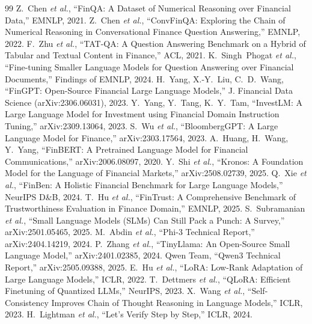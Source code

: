 \documentclass[conference]{IEEEtran}
\begin{document}
\small
\begin{thebibliography}{99}
 Z.~Chen \emph{et al.}, ``FinQA: A Dataset of Numerical Reasoning over Financial Data,'' EMNLP, 2021.
 Z.~Chen \emph{et al.}, ``ConvFinQA: Exploring the Chain of Numerical Reasoning in Conversational Finance Question Answering,'' EMNLP, 2022.
 F.~Zhu \emph{et al.}, ``TAT-QA: A Question Answering Benchmark on a Hybrid of Tabular and Textual Content in Finance,'' ACL, 2021.
 K.~Singh~Phogat \emph{et al.}, ``Fine-tuning Smaller Language Models for Question Answering over Financial Documents,'' Findings of EMNLP, 2024.
 H.~Yang, X.-Y.~Liu, C.~D.~Wang, ``FinGPT: Open-Source Financial Large Language Models,'' J. Financial Data Science (arXiv:2306.06031), 2023.
 Y.~Yang, Y.~Tang, K.~Y.~Tam, ``InvestLM: A Large Language Model for Investment using Financial Domain Instruction Tuning,'' arXiv:2309.13064, 2023.
 S.~Wu \emph{et al.}, ``BloombergGPT: A Large Language Model for Finance,'' arXiv:2303.17564, 2023.
 A.~Huang, H.~Wang, Y.~Yang, ``FinBERT: A Pretrained Language Model for Financial Communications,'' arXiv:2006.08097, 2020.
 Y.~Shi \emph{et al.}, ``Kronos: A Foundation Model for the Language of Financial Markets,'' arXiv:2508.02739, 2025.
 Q.~Xie \emph{et al.}, ``FinBen: A Holistic Financial Benchmark for Large Language Models,'' NeurIPS D\&B, 2024.
 T.~Hu \emph{et al.}, ``FinTrust: A Comprehensive Benchmark of Trustworthiness Evaluation in Finance Domain,'' EMNLP, 2025.
 S.~Subramanian \emph{et al.}, ``Small Language Models (SLMs) Can Still Pack a Punch: A Survey,'' arXiv:2501.05465, 2025.
 M.~Abdin \emph{et al.}, ``Phi-3 Technical Report,'' arXiv:2404.14219, 2024.
 P.~Zhang \emph{et al.}, ``TinyLlama: An Open-Source Small Language Model,'' arXiv:2401.02385, 2024.
 Qwen Team, ``Qwen3 Technical Report,'' arXiv:2505.09388, 2025.
 E.~Hu \emph{et al.}, ``LoRA: Low-Rank Adaptation of Large Language Models,'' ICLR, 2022.
 T.~Dettmers \emph{et al.}, ``QLoRA: Efficient Finetuning of Quantized LLMs,'' NeurIPS, 2023.
 X.~Wang \emph{et al.}, ``Self-Consistency Improves Chain of Thought Reasoning in Language Models,'' ICLR, 2023.
 H.~Lightman \emph{et al.}, ``Let's Verify Step by Step,'' ICLR, 2024.

\end{thebibliography}
\end{document}
